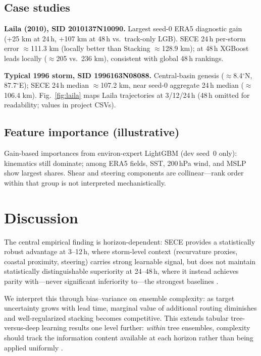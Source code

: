 \documentclass[11pt]{article}
\newcommand{\sece}{SECE}
\newcommand{\era}{ERA5}
\newcommand{\km}{\,km}
\begin{document}
\subsection{Case studies}
\textbf{Laila (2010), SID 2010137N10090.} Largest seed-0 \era{} diagnostic gain (+25\,\km{} at 24\,h, +107\,\km{} at 48\,h vs.\ track-only LGB).
\sece{} 24\,h per-storm error $\approx$111.3\,\km{} (locally better than Stacking $\approx$128.9\,\km{}); at 48\,h XGBoost leads locally ($\approx$205 vs.\ 236\,\km{}), consistent with global 48\,h rankings.

\textbf{Typical 1996 storm, SID 1996163N08088.} Central-basin genesis ($\approx$8.4$^\circ$N, 87.7$^\circ$E); \sece{} 24\,h median $\approx$107.2\,\km{}, near seed-0 aggregate 24\,h median ($\approx$106.4\,\km{}).
Fig.~\ref{fig:laila} maps Laila trajectories at 3/12/24\,h (48\,h omitted for readability; values in project CSVs).

\subsection{Feature importance (illustrative)}
Gain-based importances from environ-expert LightGBM (dev seed~0 only): kinematics still dominate; among \era{} fields, SST, 200\,hPa wind, and MSLP show largest shares.
Shear and steering components are collinear---rank order within that group is not interpreted mechanistically.

\section{Discussion}
The central empirical finding is horizon-dependent: \sece{} provides a statistically robust advantage at 3--12\,h, where storm-level context (recurvature proxies, coastal proximity, steering) carries strong learnable signal, but does not maintain statistically distinguishable superiority at 24--48\,h, where it instead achieves parity with---never significant inferiority to---the strongest baselines \cite{grinsztajn2022,ritchie2014,goerss2000}.

We interpret this through bias--variance on ensemble complexity: as target uncertainty grows with lead time, marginal value of additional routing diminishes and well-regularized stacking becomes competitive.
This extends tabular tree-versus-deep learning results one level further: \emph{within} tree ensembles, complexity should track the information content available at each horizon rather than being applied uniformly \cite{probst2019}.
\end{document}
